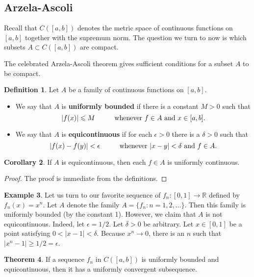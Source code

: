 \documentclass[12pt]{article}
\theoremstyle{definition}
\newtheorem{definition}{Definition}
\newtheorem{example}[definition]{Example}
\theoremstyle{theorem}
\newtheorem{theorem}[definition]{Theorem}
\newtheorem{corollary}[definition]{Corollary}
\begin{document}
\subsection{Arzela-Ascoli}

Recall that $C([a,b])$ denotes the metric space of continuous functions on $[a,b]$ together with the supremum norm. The question we turn to now is which subsets $A \subset C([a,b])$ are compact. 

The celebrated Arzela-Ascoli theorem gives sufficient conditions for a subset $A$ to be compact. 

\begin{definition}
Let $A$ be a family of continuous functions on $[a,b]$. 
\begin{itemize}
\item We say that $A$ is \textbf{uniformly bounded} if there is a constant $M > 0$ such that 
\[
|f(x)| \leqslant M \hspace{10mm} \text{whenever $f \in A$ and $x \in [a,b]$}. 
\]
\item We say that $A$ is \textbf{equicontinuous} if for each $\epsilon > 0$ there is a $\delta > 0$ such that 
\[
|f(x) - f(y)| < \epsilon \hspace{10mm} \text{whenever $|x - y| < \delta$ and $f \in A$}.
\]
\end{itemize}
\end{definition}

\begin{corollary}
If $A$ is equicontinuous, then each $f \in A$ is uniformly continuous. 
\end{corollary}

\begin{proof}
The proof is immediate from the definitions. 
\end{proof}

\begin{example}
Let us turn to our favorite sequence of $f_n : [0,1] \to \mathbb{R}$ defined by $f_n(x) = x^n$. Let $A$ denote the family $A = \{f_n : n=1, 2, \ldots\}$. Then this family is uniformly bounded (by the constant 1). However, we claim that $A$ is not equicontinuous. Indeed, let $\epsilon = 1/2$. Let $\delta > 0$ be arbitrary. Let $x \in [0,1]$ be a point satisfying $0 < |x - 1| < \delta$. Because $x^n \to 0$, there is an $n$ such that $|x^n - 1| \geqslant 1/2 = \epsilon$. 
\end{example}

\begin{theorem}
If a sequence $f_n$ in $C([a,b])$ is uniformly bounded and equicontinuous, then it has a uniformly convergent subsequence.
\end{theorem}
\end{document}
